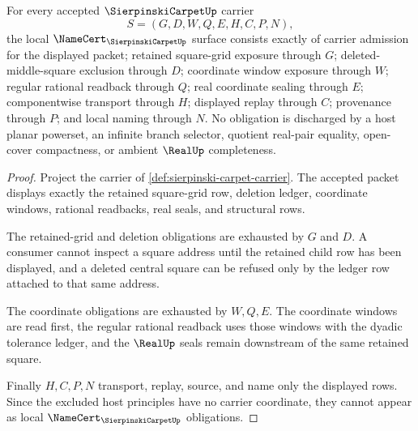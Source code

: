 \begin{theorem}
\label{thm:sierpinski-carpet-namecert-obligations}
For every accepted $\SierpinskiCarpetUp$ carrier
$$
S=(G,D,W,Q,E,H,C,P,N),
$$
the local $\NameCert_{\SierpinskiCarpetUp}$ surface consists exactly of carrier admission for the displayed packet; retained square-grid exposure through $G$; deleted-middle-square exclusion through $D$; coordinate window exposure through $W$; regular rational readback through $Q$; real coordinate sealing through $E$; componentwise transport through $H$; displayed replay through $C$; provenance through $P$; and local naming through $N$. No obligation is discharged by a host planar powerset, an infinite branch selector, quotient real-pair equality, open-cover compactness, or ambient $\RealUp$ completeness.
\end{theorem}
\begin{proof}
Project the carrier of \autoref{def:sierpinski-carpet-carrier}. The accepted packet displays exactly the retained square-grid row, deletion ledger, coordinate windows, rational readbacks, real seals, and structural rows.

The retained-grid and deletion obligations are exhausted by $G$ and $D$. A consumer cannot inspect a square address until the retained child row has been displayed, and a deleted central square can be refused only by the ledger row attached to that same address.

The coordinate obligations are exhausted by $W,Q,E$. The coordinate windows are read first, the regular rational readback uses those windows with the dyadic tolerance ledger, and the $\RealUp$ seals remain downstream of the same retained square.

Finally $H,C,P,N$ transport, replay, source, and name only the displayed rows. Since the excluded host principles have no carrier coordinate, they cannot appear as local $\NameCert_{\SierpinskiCarpetUp}$ obligations.
\end{proof}

